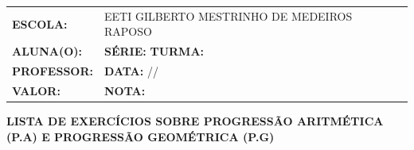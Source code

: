 \documentclass[12pt]{article}
\begin{document}
    \vspace{0.5cm}
    \begin{center}
        \large
        \begin{tabular}{|l l|}
            \hline
            \textbf{ESCOLA:} & EETI GILBERTO MESTRINHO DE MEDEIROS RAPOSO \\ 
            \textbf{ALUNA(O):} & \underline{\hspace{7cm}} \textbf{SÉRIE:} \underline{\hspace{1.5cm}} \textbf{TURMA:} \underline{\hspace{1.5cm}} \\
            \textbf{PROFESSOR:} & \underline{\hspace{7cm}} \textbf{DATA:} \underline{\hspace{1.5cm}}/\underline{\hspace{1.5cm}}/\underline{\hspace{1.5cm}} \\
            \textbf{VALOR:} & \underline{\hspace{3cm}} \textbf{NOTA:} \underline{\hspace{1.5cm}} \\
            \hline
        \end{tabular}
    \end{center}
    \vspace{0.5cm}
    
    \begin{center}
        \Large\textbf{LISTA DE EXERCÍCIOS SOBRE PROGRESSÃO ARITMÉTICA (P.A) E PROGRESSÃO GEOMÉTRICA (P.G)}
    \end{center}
    
    \vspace{0.3cm}
    
\end{document}
